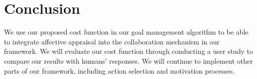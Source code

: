 \documentclass[conference]{IEEEtran}
\begin{document}

\vspace*{-4mm}
\section{Conclusion}
\vspace*{-1mm}
We use our proposed cost function in our goal management algorithm to be able to
integrate affective appraisal into the collaboration mechanism in our framework.
We will evaluate our cost function through conducting a user study to compare
our results with humans' responses. We will continue to implement other parts of
our framework, including action selection and motivation processes.
\vspace*{-2mm}





%
%
%



\end{document}
